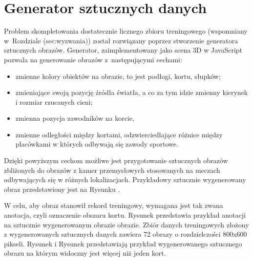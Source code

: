 \newpage
\section{Generator sztucznych danych}
\label{sec:generator}

Problem skompletowania dostatecznie licznego zbioru treningowego (wspomniany w~Rozdziale \numberref(sec:wyzwania)) został rozwiązany poprzez stworzenie generatora sztucznych obrazów.
Generator, zaimplementowany jako scena 3D w JavaScript pozwala na generowanie obrazów z~następującymi cechami:

\begin{itemize}
	\item zmienne kolory obiektów na obrazie, to jest podłogi, kortu, słupków;
	\item zmieniające swoją pozycję źródła światła, a co za tym idzie zmienny kierynek i rozmiar rzucanych cieni;
	\item zmienna pozycja zawodników na korcie, 
	\item zmienne odległości między kortami, odzwierciedlające różnice między placówkami w których odbywają się zawody sportowe.
\end{itemize}

Dzięki powyższym cechom możliwe jest przygotowanie sztucznych obrazów zbliżonych do obrazów z kamer przemysłowych stosowanych na meczach odbywających się w różnych lokalizacjach. Przykładowy sztucznie wygenerowany obraz przedstawiony jest na Rysunku .

W celu, aby obraz stanowił rekord treningowy, wymagana jest tak zwana anotacja, czyli oznaczenie obszaru kortu. Rysunek  przedstawia przykład anotacji na sztucznie wygenerowanym obrazie obrazie.
Zbiór danych treningowych złożony z wygenerowanych sztucznych danych zawiera 72 obrazy o rozdzielczości 800x600 pikseli. Rysunek  i Rysunek  przedstawiają przykład wygenerowanego sztucznego obrazu na którym widoczny jest więcej niż jeden kort.

